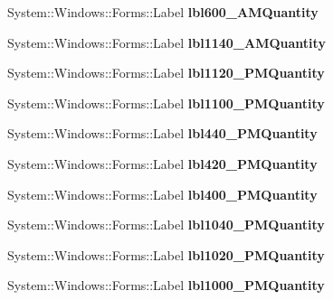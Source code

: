 \begin{DoxyCompactItemize}
System\+::\+Windows\+::\+Forms\+::\+Label {\bfseries lbl600\+\_\+A\+M\+Quantity}
\item 
\mbox{\label{class_project1_1_1_my_form_acc48135993ebf0bb6fe146312807bec0}} 
System\+::\+Windows\+::\+Forms\+::\+Label {\bfseries lbl1140\+\_\+A\+M\+Quantity}
\item 
\mbox{\label{class_project1_1_1_my_form_a89f652e25a3344f5cfd6ff2da4f43cdd}} 
System\+::\+Windows\+::\+Forms\+::\+Label {\bfseries lbl1120\+\_\+P\+M\+Quantity}
\item 
\mbox{\label{class_project1_1_1_my_form_a7752f4170bb62e163be0d2e34aa46e83}} 
System\+::\+Windows\+::\+Forms\+::\+Label {\bfseries lbl1100\+\_\+P\+M\+Quantity}
\item 
\mbox{\label{class_project1_1_1_my_form_ab3aad9d3b93dec477af69542ecc49efe}} 
System\+::\+Windows\+::\+Forms\+::\+Label {\bfseries lbl440\+\_\+P\+M\+Quantity}
\item 
\mbox{\label{class_project1_1_1_my_form_a8893bbfe45140f72e18c9ca94e2d5f9f}} 
System\+::\+Windows\+::\+Forms\+::\+Label {\bfseries lbl420\+\_\+P\+M\+Quantity}
\item 
\mbox{\label{class_project1_1_1_my_form_acd955e973529e12ac0808141597d3416}} 
System\+::\+Windows\+::\+Forms\+::\+Label {\bfseries lbl400\+\_\+P\+M\+Quantity}
\item 
\mbox{\label{class_project1_1_1_my_form_a8d8647a00bb5904448051714c9029642}} 
System\+::\+Windows\+::\+Forms\+::\+Label {\bfseries lbl1040\+\_\+P\+M\+Quantity}
\item 
\mbox{\label{class_project1_1_1_my_form_adf195ff6f846c6252fdd12f1cbffc6fb}} 
System\+::\+Windows\+::\+Forms\+::\+Label {\bfseries lbl1020\+\_\+P\+M\+Quantity}
\item 
\mbox{\label{class_project1_1_1_my_form_a7fe89362d0d1d9886f4787ba2c05cf8a}} 
System\+::\+Windows\+::\+Forms\+::\+Label {\bfseries lbl1000\+\_\+P\+M\+Quantity}

\end{DoxyCompactItemize}
